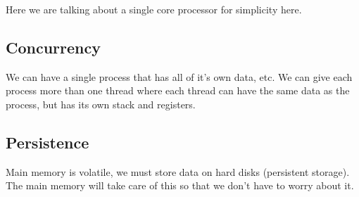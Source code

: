 \begin{note}
	Here we are talking about a single core processor for simplicity here.
\end{note}

\subsection{Concurrency}\label{sub:concurrency}

We can have a single process that has all of it's own data, etc.
We can give each process more than one thread where each thread can have the same data as the process, but has its own stack and registers.

\subsection{Persistence}\label{sub:persistence}

Main memory is volatile, we must store data on hard disks (persistent storage).
The main memory will take care of this so that we don't have to worry about it.
